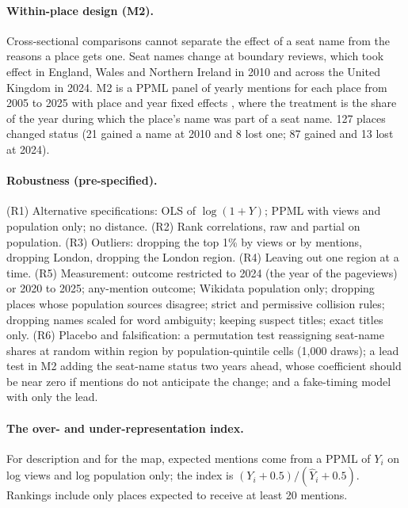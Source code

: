 \documentclass[11pt,a4paper]{article}
\begin{document}
\paragraph{Within-place design (M2).} Cross-sectional comparisons cannot separate the effect of a seat name from the reasons a place gets one. Seat names change at boundary reviews, which took effect in England, Wales and Northern Ireland in 2010 and across the United Kingdom in 2024. M2 is a PPML panel of yearly mentions for each place from 2005 to 2025 with place and year fixed effects \citep{Correia2020}, where the treatment is the share of the year during which the place's name was part of a seat name. 127 places changed status (21 gained a name at 2010 and 8 lost one; 87 gained and 13 lost at 2024).

\paragraph{Robustness (pre-specified).} (R1) Alternative specifications: OLS of $\log(1+Y)$; PPML with views and population only; no distance. (R2) Rank correlations, raw and partial on population. (R3) Outliers: dropping the top 1\% by views or by mentions, dropping London, dropping the London region. (R4) Leaving out one region at a time. (R5) Measurement: outcome restricted to 2024 (the year of the pageviews) or 2020 to 2025; any-mention outcome; Wikidata population only; dropping places whose population sources disagree; strict and permissive collision rules; dropping names scaled for word ambiguity; keeping suspect titles; exact titles only. (R6) Placebo and falsification: a permutation test reassigning seat-name shares at random within region by population-quintile cells (1,000 draws); a lead test in M2 adding the seat-name status two years ahead, whose coefficient should be near zero if mentions do not anticipate the change; and a fake-timing model with only the lead.

\paragraph{The over- and under-representation index.} For description and for the map, expected mentions come from a PPML of $Y_i$ on log views and log population only; the index is $(Y_i + 0.5)/(\hat Y_i + 0.5)$. Rankings include only places expected to receive at least 20 mentions.
\end{document}
